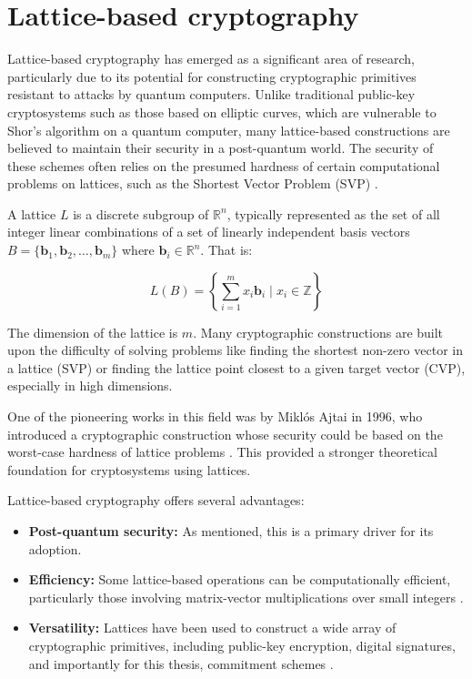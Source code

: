 \section{Lattice-based cryptography}\label{sec:lattices}

Lattice-based cryptography has emerged as a significant area of research,
particularly due to its potential for constructing cryptographic primitives
resistant to attacks by quantum computers. Unlike traditional public-key
cryptosystems such as those based on elliptic curves, which are vulnerable to
Shor's algorithm on a quantum computer, many lattice-based constructions are
believed to maintain their security in a post-quantum world. The security of
these schemes often relies on the presumed hardness of certain computational
problems on lattices, such as the Shortest Vector Problem (SVP) \cite{AjtaiLattices, LatticeTutorial}.

A lattice $L$ is a discrete subgroup of $\mathbb{R}^n$, typically
represented as the set of all integer linear combinations of a set of linearly
independent basis vectors $B = \{\mathbf{b}_1, \mathbf{b}_2, \dots, \mathbf{b}_m\}$
where $\mathbf{b}_i \in \mathbb{R}^n$. That is:

\[
	L(B) = \left\{ \sum_{i=1}^{m} x_i \mathbf{b}_i \mid x_i \in \mathbb{Z} \right\}
\]

The dimension of the lattice is $m$. Many cryptographic constructions are
built upon the difficulty of solving problems like finding the shortest
non-zero vector in a lattice (SVP) or finding the lattice point closest to a
given target vector (CVP), especially in high dimensions.

One of the pioneering works in this field was by Miklós Ajtai in 1996, who
introduced a cryptographic construction whose security could be based on the
worst-case hardness of lattice problems \cite{AjtaiLattices}. This provided a
stronger theoretical foundation for cryptosystems using lattices.

Lattice-based cryptography offers several advantages:

\begin{itemize}
    \item \textbf{Post-quantum security:} As mentioned, this is a primary driver for its adoption.
    \item \textbf{Efficiency:} Some lattice-based operations can be
		computationally efficient, particularly those involving matrix-vector
		multiplications over small integers \cite{LatticeTutorial}.
    \item \textbf{Versatility:} Lattices have been used to construct a wide
		array of cryptographic primitives, including public-key encryption,
		digital signatures, and importantly for this thesis, commitment
		schemes \cite{LatticeTutorial}.
\end{itemize}

